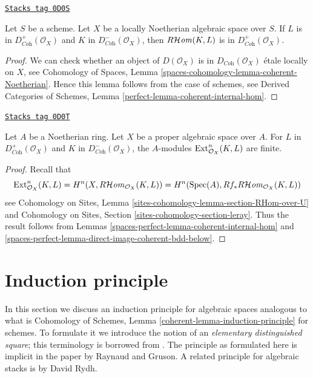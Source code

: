 \begin{lemma}
\label{spaces-perfect-lemma-coherent-internal-hom}
\href{https://stacks.math.columbia.edu/tag/0D0S}{\texttt{Stacks tag 0D0S}}

Let $S$ be a scheme. Let $X$ be a locally Noetherian algebraic space over $S$.
If $L$ is in $D^+_{\textit{Coh}}(\mathcal{O}_X)$
and $K$ in $D^-_{\textit{Coh}}(\mathcal{O}_X)$, then
$R\mathcal{H}\mathit{om}(K, L)$ is in $D^+_{\textit{Coh}}(\mathcal{O}_X)$.
\end{lemma}

\begin{proof}
We can check whether an object of $D(\mathcal{O}_X)$ is in
$D_{\textit{Coh}}(\mathcal{O}_X)$ \'etale locally on $X$, see
Cohomology of Spaces, Lemma \ref{spaces-cohomology-lemma-coherent-Noetherian}.
Hence this lemma follows from the case of schemes, see
Derived Categories of Schemes, Lemma \ref{perfect-lemma-coherent-internal-hom}.
\end{proof}

\begin{lemma}
\label{spaces-perfect-lemma-ext-finite}
\href{https://stacks.math.columbia.edu/tag/0D0T}{\texttt{Stacks tag 0D0T}}

Let $A$ be a Noetherian ring. Let $X$ be a proper algebraic space over $A$.
For $L$ in $D^+_{\textit{Coh}}(\mathcal{O}_X)$ and $K$ in
$D^-_{\textit{Coh}}(\mathcal{O}_X)$, the $A$-modules
$\operatorname{Ext}_{\mathcal{O}_X}^n(K, L)$ are finite.
\end{lemma}

\begin{proof}
Recall that
$$
\operatorname{Ext}_{\mathcal{O}_X}^n(K, L) =
H^n(X, R\mathcal{H}\mathit{om}_{\mathcal{O}_X}(K, L)) =
H^n(\operatorname{Spec}(A), Rf_*R\mathcal{H}\mathit{om}_{\mathcal{O}_X}(K, L))
$$
see Cohomology on Sites, Lemma \ref{sites-cohomology-lemma-section-RHom-over-U}
and Cohomology on Sites, Section \ref{sites-cohomology-section-leray}.
Thus the result follows from
Lemmas \ref{spaces-perfect-lemma-coherent-internal-hom} and
\ref{spaces-perfect-lemma-direct-image-coherent-bdd-below}.
\end{proof}

\section{Induction principle}
\label{spaces-perfect-section-induction}
In this section we discuss an induction principle for algebraic spaces
analogous to what is
Cohomology of Schemes, Lemma \ref{coherent-lemma-induction-principle}
for schemes. To formulate it we introduce the notion of an
{\it elementary distinguished square}; this terminology is borrowed
from \cite{MV}.
The principle as formulated here is implicit in the paper \cite{GruRay}
by Raynaud and Gruson.
A related principle for algebraic stacks is
\cite[Theorem D]{rydh_etale_devissage} by David Rydh.

